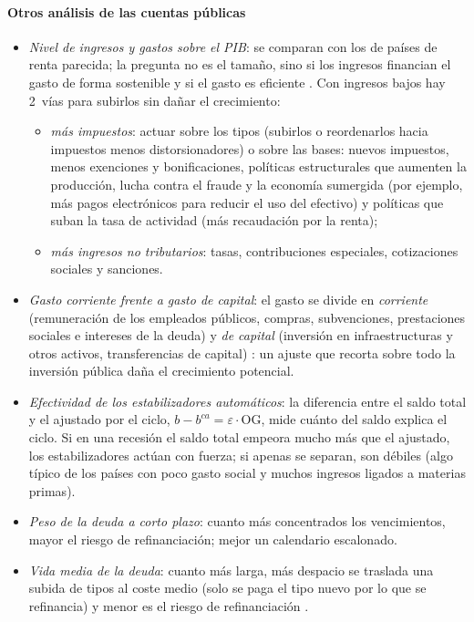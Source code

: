 \documentclass[11pt]{article}
\begin{document}
\paragraph{Otros análisis de las cuentas públicas}
\begin{itemize}
\item \emph{Nivel de ingresos y gastos sobre el PIB}: se comparan con los de países de renta parecida; la pregunta no es el tamaño, sino si los ingresos financian el gasto de forma sostenible y si el gasto es eficiente  . Con ingresos bajos hay 2~vías para subirlos sin dañar el crecimiento:
  \begin{itemize}
  \item \emph{más impuestos}: actuar sobre los tipos (subirlos o reordenarlos hacia impuestos menos distorsionadores) o sobre las bases: nuevos impuestos, menos exenciones y bonificaciones, políticas estructurales que aumenten la producción, lucha contra el fraude y la economía sumergida (por ejemplo, más pagos electrónicos para reducir el uso del efectivo) y políticas que suban la tasa de actividad (más recaudación por la renta);
  \item \emph{más ingresos no tributarios}: tasas, contribuciones especiales, cotizaciones sociales y sanciones.
  \end{itemize}
\item \emph{Gasto corriente frente a gasto de capital}: el gasto se divide en \emph{corriente} (remuneración de los empleados públicos, compras, subvenciones, prestaciones sociales e intereses de la deuda) y \emph{de capital} (inversión en infraestructuras y otros activos, transferencias de capital) \parencite{SEC2010}: un ajuste que recorta sobre todo la inversión pública daña el crecimiento potencial.
\item \emph{Efectividad de los estabilizadores automáticos}: la diferencia entre el saldo total y el ajustado por el ciclo, $b-b^{ca}=\varepsilon\cdot\mathrm{OG}$, mide cuánto del saldo explica el ciclo. Si en una recesión el saldo total empeora mucho más que el ajustado, los estabilizadores actúan con fuerza; si apenas se separan, son débiles (algo típico de los países con poco gasto social y muchos ingresos ligados a materias primas).
\item \emph{Peso de la deuda a corto plazo}: cuanto más concentrados los vencimientos, mayor el riesgo de refinanciación; mejor un calendario escalonado.
\item \emph{Vida media de la deuda}: cuanto más larga, más despacio se traslada una subida de tipos al coste medio (solo se paga el tipo nuevo por lo que se refinancia) y menor es el riesgo de refinanciación \parencite{Sahuquillo2023}.

\end{itemize}
\end{document}
